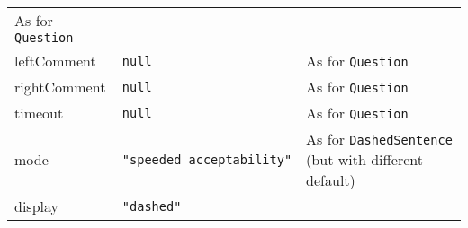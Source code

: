 \documentclass[
]{article}
\begin{document}
\begin{RaggedRight}
\begin{longtable}[]{p{1.7in}p{1in}p{3.15in}}
\begin{minipage}[t]{0.49\columnwidth}
As for \texttt{Question}\strut
\end{minipage}\tabularnewline
\begin{minipage}[t]{0.17\columnwidth}\raggedright
leftComment\strut
\end{minipage} & \begin{minipage}[t]{0.25\columnwidth}\raggedright
\texttt{null}\strut
\end{minipage} & \begin{minipage}[t]{0.49\columnwidth}\raggedright
As for \texttt{Question}\strut
\end{minipage}\tabularnewline
\begin{minipage}[t]{0.17\columnwidth}\raggedright
rightComment\strut
\end{minipage} & \begin{minipage}[t]{0.25\columnwidth}\raggedright
\texttt{null}\strut
\end{minipage} & \begin{minipage}[t]{0.49\columnwidth}\raggedright
As for \texttt{Question}\strut
\end{minipage}\tabularnewline
\begin{minipage}[t]{0.17\columnwidth}\raggedright
timeout\strut
\end{minipage} & \begin{minipage}[t]{0.25\columnwidth}\raggedright
\texttt{null}\strut
\end{minipage} & \begin{minipage}[t]{0.49\columnwidth}\raggedright
As for \texttt{Question}\strut
\end{minipage}\tabularnewline
\begin{minipage}[t]{0.17\columnwidth}\raggedright
mode\strut
\end{minipage} & \begin{minipage}[t]{0.25\columnwidth}\raggedright
\texttt{"speeded\ acceptability"}\strut
\end{minipage} & \begin{minipage}[t]{0.49\columnwidth}\raggedright
As for \texttt{DashedSentence} (but with different default)\strut
\end{minipage}\tabularnewline
\begin{minipage}[t]{0.17\columnwidth}\raggedright
display\strut
\end{minipage} & \begin{minipage}[t]{0.25\columnwidth}\raggedright
\texttt{"dashed"}\strut
\end{minipage} & \begin{minipage}[t]{0.49\columnwidth}\raggedright

\end{minipage}
\end{longtable}
\end{RaggedRight}
\end{document}
